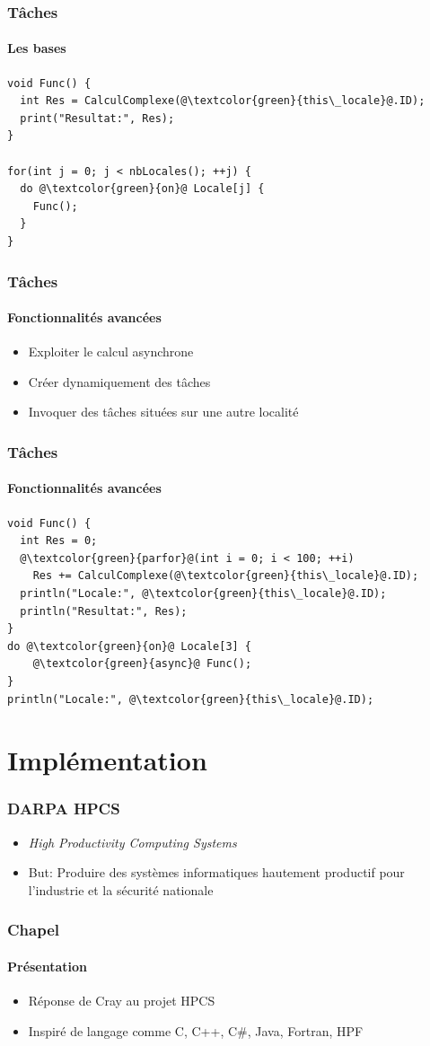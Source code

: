 \documentclass{beamer}
\begin{document}
\begin{frame}[fragile]
\frametitle{Tâches}
\framesubtitle{Les bases}
\begin{lstlisting}
void Func() {
  int Res = CalculComplexe(@\textcolor{green}{this\_locale}@.ID);
  print("Resultat:", Res);
}

for(int j = 0; j < nbLocales(); ++j) {
  do @\textcolor{green}{on}@ Locale[j] {
    Func();
  }
}
\end{lstlisting}
\end{frame}

\begin{frame}
\frametitle{Tâches}
\framesubtitle{Fonctionnalités avancées}
\begin{itemize}
\item Exploiter le calcul asynchrone
\item Créer dynamiquement des tâches
\item Invoquer des tâches situées sur une autre localité
\end{itemize}
\end{frame}

\begin{frame}[fragile]
\frametitle{Tâches}
\framesubtitle{Fonctionnalités avancées}
\begin{lstlisting}
void Func() {
  int Res = 0;
  @\textcolor{green}{parfor}@(int i = 0; i < 100; ++i)
    Res += CalculComplexe(@\textcolor{green}{this\_locale}@.ID);
  println("Locale:", @\textcolor{green}{this\_locale}@.ID);
  println("Resultat:", Res);
}
do @\textcolor{green}{on}@ Locale[3] {
    @\textcolor{green}{async}@ Func();
}
println("Locale:", @\textcolor{green}{this\_locale}@.ID);
\end{lstlisting}
\end{frame}

\section{Implémentation}
\begin{frame}
\frametitle{DARPA HPCS}
\begin{itemize}
\item \textit{High Productivity Computing Systems}
\item But: Produire des systèmes informatiques hautement productif pour l'industrie et la sécurité nationale
\end{itemize}
\end{frame}

\begin{frame}
\frametitle{Chapel}
\framesubtitle{Présentation}
\begin{itemize}
\item Réponse de Cray au projet HPCS
\item Inspiré de langage comme C, C++, C\#, Java, Fortran, HPF
\end{itemize}
\end{frame}
\end{document}
